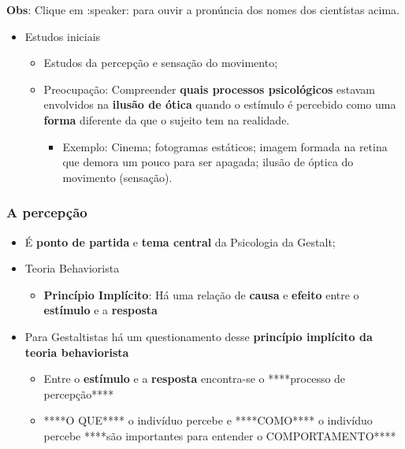 \documentclass[
]{book}
\providecommand{\tightlist}{%
  \setlength{\itemsep}{0pt}\setlength{\parskip}{0pt}}
\begin{document}
\textbf{Obs}: Clique em :speaker: para ouvir a pronúncia dos nomes dos
cientístas acima.

\begin{itemize}
\tightlist
\item
  Estudos iniciais

  \begin{itemize}
  \tightlist
  \item
    Estudos da percepção e sensação do movimento;
  \item
    Preocupação: Compreender \textbf{quais processos psicológicos}
    estavam envolvidos na \textbf{ilusão de ótica} quando o estímulo é
    percebido como uma \textbf{forma} diferente da que o sujeito tem na
    realidade.

    \begin{itemize}
    \tightlist
    \item
      Exemplo: Cinema; fotogramas estáticos; imagem formada na retina
      que demora um pouco para ser apagada; ilusão de óptica do
      movimento (sensação).
    \end{itemize}
  \end{itemize}
\end{itemize}

\hypertarget{a-percepuxe7uxe3o}{%
\subsubsection{A percepção}\label{a-percepuxe7uxe3o}}

\begin{itemize}
\tightlist
\item
  É \textbf{ponto de partida} e \textbf{tema central} da Psicologia da
  Gestalt;
\item
  Teoria Behaviorista

  \begin{itemize}
  \tightlist
  \item
    \textbf{Princípio Implícito}: Há uma relação de \textbf{causa} e
    \textbf{efeito} entre o \textbf{estímulo} e a \textbf{resposta}
  \end{itemize}
\item
  Para Gestaltistas há um questionamento desse \textbf{princípio
  implícito da teoria behaviorista}

  \begin{itemize}
  \tightlist
  \item
    Entre o \textbf{estímulo} e a \textbf{resposta} encontra-se o
    ****processo de percepção****
  \item
    ****O QUE**** o indivíduo percebe e ****COMO**** o indivíduo percebe
    ****são importantes para entender o COMPORTAMENTO****
  \end{itemize}
\end{itemize}
\end{document}
